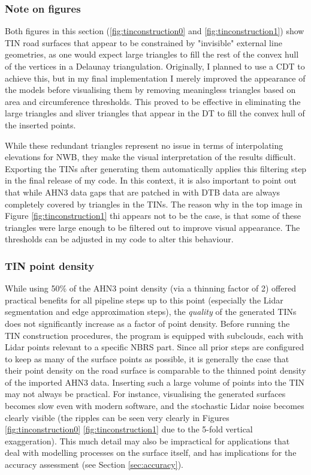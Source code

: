 \subsubsection{Note on figures}

Both figures in this section (\ref{fig:tinconstruction0} and \ref{fig:tinconstruction1}) show TIN road surfaces that appear to be constrained by "invisible" external line geometries, as one would expect large triangles to fill the rest of the convex hull of the vertices in a Delaunay triangulation. Originally, I planned to use a CDT to achieve this, but in my final implementation I merely improved the appearance of the models before visualising them by removing meaningless triangles based on area and circumference thresholds. This proved to be effective in eliminating the large triangles and sliver triangles that appear in the DT to fill the convex hull of the inserted points.

While these redundant triangles represent no issue in terms of interpolating elevations for NWB, they make the visual interpretation of the results difficult. Exporting the TINs after generating them automatically applies this filtering step in the final release of my code. In this context, it is also important to point out that while AHN3 data gaps that are patched in with DTB data are always completely covered by triangles in the TINs. The reason why in the top image in Figure \ref{fig:tinconstruction1} thi appears not to be the case, is that some of these triangles were large enough to be filtered out to improve visual appearance. The thresholds can be adjusted in my code to alter this behaviour.

\subsubsection{TIN point density}

While using 50\% of the AHN3 point density (via a thinning factor of 2) offered practical benefits for all pipeline steps up to this point (especially the Lidar segmentation and edge approximation steps), the \textit{quality} of the generated TINs does not significantly increase as a factor of point density. Before running the TIN construction procedures, the program is equipped with subclouds, each with Lidar points relevant to a specific NBRS part. Since all prior steps are configured to keep as many of the surface points as possible, it is generally the case that their point density on the road surface is comparable to the thinned point density of the imported AHN3 data. Inserting such a large volume of points into the TIN may not always be practical. For instance, visualising the generated surfaces becomes slow even with modern software, and the stochastic Lidar noise becomes clearly visible (the ripples can be seen very clearly in Figures \ref{fig:tinconstruction0} \ref{fig:tinconstruction1} due to the 5-fold vertical exaggeration). This much detail may also be impractical for applications that deal with modelling processes on the surface itself, and has implications for the accuracy assessment (see Section \ref{sec:accuracy}).

